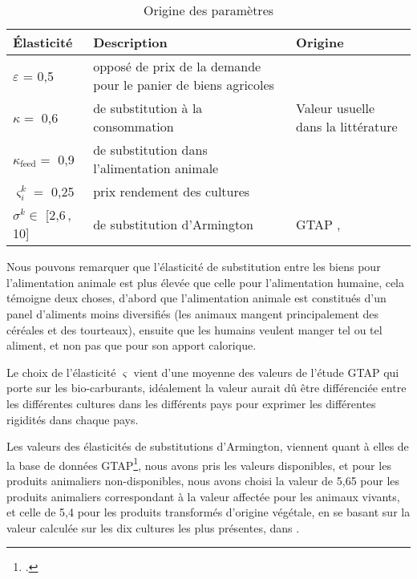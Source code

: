 \begin{table}[h]
    \centering
    \begin{tabularx}{\textwidth}{l >{\raggedright\arraybackslash}X >{\raggedright\arraybackslash}X}
        \textbf{Élasticité}        & \textbf{Description}                                           & \textbf{Origine}                                   \\ \hline
        $\varepsilon$ = 0,5        & opposé de prix de la demande pour le panier de biens agricoles & \cite{Comin2021}                                   \\
        $\kappa =$ 0,6             & de substitution à la consommation                              & Valeur usuelle dans la littérature \cite{Rude2000} \\
        $\kappa_\text{feed} =$ 0,9 & de substitution dans l'alimentation animale                    & \cite{Rude2000}                                    \\
        $\varsigma_i^k =$ 0,25     & prix rendement des cultures                                    & \cite{Keeney2009}                                  \\
        $\sigma^k \in$ [2,6\,, 10] & de substitution d'Armington                                    & GTAP  \cite{Aguiar2022}, \cite{Costinot2016}       \\
        \hline
    \end{tabularx}
    \caption{Origine des paramètres}
    \label{tab:ela}
\end{table}

Nous pouvons remarquer que l'élasticité de substitution entre les biens pour l'alimentation animale est plus élevée que celle pour l'alimentation humaine, cela témoigne deux choses, d'abord que l'alimentation animale est constitués d'un panel d'aliments moins diversifiés (les animaux mangent principalement des céréales et des tourteaux), ensuite que les humains veulent manger tel ou tel aliment, et non pas que pour son apport calorique.

Le choix de l'élasticité $\varsigma$ vient d'une moyenne des valeurs de l'étude GTAP \cite{Miller2009} qui porte sur les bio-carburants, idéalement la valeur aurait dû être différenciée entre les différentes cultures dans les différents pays pour exprimer les différentes rigidités dans chaque pays.

Les valeurs des élasticités de substitutions d'Armington, viennent quant à elles de la base de données GTAP\footcite{Aguiar2022}, nous avons pris les valeurs disponibles, et pour les produits animaliers non-disponibles, nous avons choisi la valeur de 5,65 pour les produits animaliers correspondant à la valeur affectée pour les animaux vivants, et celle de 5,4 pour les produits transformés d'origine végétale, en se basant sur la valeur calculée sur les dix cultures les plus présentes, dans \cite{Costinot2016}.
